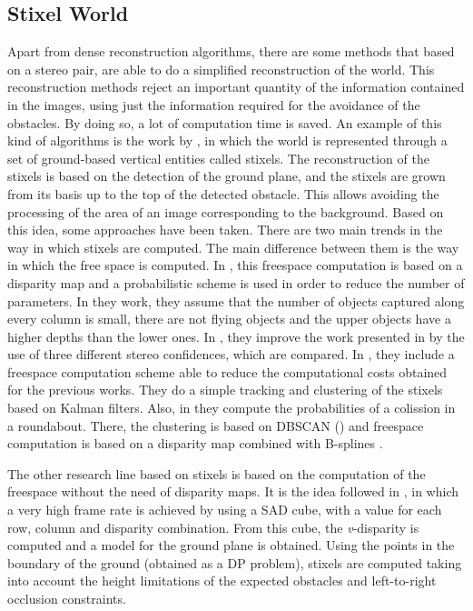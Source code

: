 \subsection{Stixel World}\label{ch:chapter00_02_04}

Apart from dense reconstruction algorithms, there are some methods that based on a stereo pair, are able to do a simplified reconstruction of the world. This reconstruction methods reject an important quantity of the information contained in the images, using just the information required for the avoidance of the obstacles. By doing so, a lot of computation time is saved. An example of this kind of algorithms is the work by \cite{badino2009stixel}, in which the world is represented through a set of ground-based vertical entities called stixels. The reconstruction of the stixels is based on the detection of the ground plane, and the stixels are grown from its basis up to the top of the detected obstacle. This allows avoiding the processing of the area of an image corresponding to the background. 
Based on this idea, some approaches have been taken. There are two main trends in the way in which stixels are computed. The main difference between them is the way in which the free space is computed. In \cite{pfeiffer2011towards, pfeiffer2013exploiting, pfeiffer2010efficient, muffert2012may}, this freespace computation is based on a disparity map and a probabilistic scheme is used in order to reduce the number of parameters. In they work, they assume that the number of objects captured along every column is small, there are not flying objects and the upper objects have a higher depths than the lower ones. In \cite{pfeiffer2013exploiting}, they improve the work presented in \cite{pfeiffer2011towards} by the use of three different stereo confidences, which are compared. In \cite{pfeiffer2010efficient}, they include a freespace computation scheme able to reduce the computational costs obtained for the previous works. They do a simple tracking and clustering of the stixels based on Kalman filters. Also, in \cite{muffert2012may} they compute the probabilities of a colission in a roundabout. There, the clustering is based on DBSCAN (\cite{ester1996density}) and freespace computation is based on a disparity map combined with B-splines \cite{wedel2009b}. 

The other research line based on stixels is based on the computation of the freespace without the need of disparity maps. It is the idea followed in \cite{benenson2011stixels, benenson2012pedestrian, benenson2012fast, gunyel2012stixels}, in which a very high frame rate is achieved by using a \ac{SAD} cube, with a value for each row, column and disparity combination. From this cube, the \emph{v}-disparity is computed and a model for the ground plane is obtained. Using the points in the boundary of the ground (obtained as a \ac{DP} problem), stixels are computed taking into account the height limitations of the expected obstacles and left-to-right occlusion constraints. 


